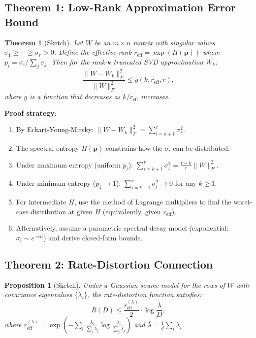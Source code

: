 \documentclass[11pt,a4paper]{article}
\newtheorem{theorem}{Theorem}
\newtheorem{proposition}{Proposition}
\begin{document}
\subsection{Theorem 1: Low-Rank Approximation Error Bound}

\begin{theorem}[Sketch]
Let $W$ be an $m \times n$ matrix with singular values $\sigma_1 \geq \cdots \geq \sigma_r > 0$. Define the effective rank $r_{\text{eff}} = \exp(H(\mathbf{p}))$ where $p_i = \sigma_i / \sum_j \sigma_j$. Then for the rank-$k$ truncated SVD approximation $W_k$:
\begin{equation}
    \frac{\|W - W_k\|_F^2}{\|W\|_F^2} \leq g(k, r_{\text{eff}}, r),
\end{equation}
where $g$ is a function that decreases as $k / r_{\text{eff}}$ increases.
\end{theorem}

\textbf{Proof strategy}:
\begin{enumerate}
    \item By Eckart-Young-Mirsky: $\|W - W_k\|_F^2 = \sum_{i=k+1}^r \sigma_i^2$.
    \item The spectral entropy $H(\mathbf{p})$ constrains how the $\sigma_i$ can be distributed.
    \item Under maximum entropy (uniform $p_i$): $\sum_{i=k+1}^r \sigma_i^2 = \frac{r-k}{r}\|W\|_F^2$.
    \item Under minimum entropy ($p_1 \to 1$): $\sum_{i=k+1}^r \sigma_i^2 \to 0$ for any $k \geq 1$.
    \item For intermediate $H$, use the method of Lagrange multipliers to find the worst-case distribution at given $H$ (equivalently, given $r_{\text{eff}}$).
    \item Alternatively, assume a parametric spectral decay model (exponential: $\sigma_i \sim e^{-\alpha i}$) and derive closed-form bounds.
\end{enumerate}

\subsection{Theorem 2: Rate-Distortion Connection}

\begin{proposition}[Sketch]
Under a Gaussian source model for the rows of $W$ with covariance eigenvalues $\{\lambda_i\}$, the rate-distortion function satisfies:
\begin{equation}
    R(D) \leq \frac{r_{\text{eff}}^{(\lambda)}}{2} \cdot \log\frac{\bar{\lambda}}{D},
\end{equation}
where $r_{\text{eff}}^{(\lambda)} = \exp\!\left(-\sum_i \frac{\lambda_i}{\sum_j \lambda_j}\log\frac{\lambda_i}{\sum_j \lambda_j}\right)$ and $\bar{\lambda} = \frac{1}{d}\sum_i \lambda_i$.
\end{proposition}
\end{document}
